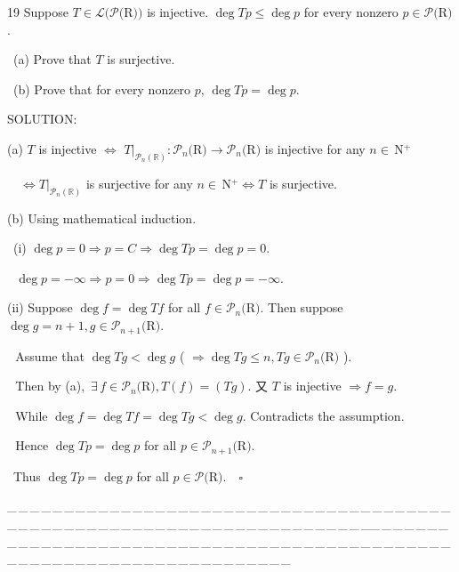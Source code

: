 \documentclass[a4paper, 11pt, UTF8]{article}
\def\Lm{\mathcal{L}}
\def\Po{\mathcal{P}}
\def\Rbb{\mathbb{R}}
\def\Nbp{$\,{\timesbf N}$^+}
\begin{document}
\begin{large}
{\timesbf\Large 19} {\timessl\Large 
Suppose $T\in\Lm(\Po(${\timesbf R}$))$ is injective. $\deg Tp\leq\deg p$ for every nonzero $p\in\Po(${\timesbf R}$)$.
}\par\quad\,
(a) {\timessl\Large Prove that $T$ is surjective.}\par\quad\,
(b) {\timessl\Large Prove that for every nonzero $p$, $\deg Tp=\deg p$.}\par
{\timesbf S\footnotesize{OLUTION:}}\par\quad
(a) $T$ is injective $\Longleftrightarrow$ $T|_{\Po_n(\Rbb)}:\Po_n(${\timesbf R}$)\rightarrow \Po_n(${\timesbf R}$)$ is injective for any $n\in\Nbp$\par\qquad\qquad\qquad\quad\,\,\,\,
$\Longleftrightarrow T|_{\Po_n(\Rbb)}$ is surjective for any $n\in\Nbp\Longleftrightarrow T$ is surjective.\par\quad
(b) Using mathematical induction.\par\qquad\,
(i) $\deg p=0\Rightarrow p=C\Rightarrow\deg Tp=\deg p=0.$\par\qquad\quad\,\,
$\deg p=-\infty\Rightarrow p=0\Rightarrow\deg Tp=\deg p=-\infty.$\par\qquad
(ii) Suppose $\deg f=\deg Tf$ for all $f\in\Po_{n}(${\timesbf R}$).$ Then suppose $\deg g=n+1,g\in\Po_{n+1}(${\timesbf R}$)$.\par\qquad\quad\,\,
Assume that $\deg Tg<\deg g$ ( $\Rightarrow\deg Tg\leq n,Tg\in\Po_{n}(${\timesbf R}$)$ ).\par\qquad\quad\,\,
Then by (a), \,$\exists\,f\in\Po_{n}(${\timesbf R}$),T(f)=(Tg).$ 又 $T$ is injective $\Rightarrow f=g$.\par\qquad\quad\,\,
While $\deg f=\deg Tf=\deg Tg<\deg g$. Contradicts the assumption.\par\qquad\quad\,\,
Hence $\deg Tp=\deg p$ for all $p\in\Po_{n+1}(${\timesbf R}$)$.\par\qquad\,
Thus $\deg Tp=\deg p$ for all $p\in\Po(${\timesbf R}$).\quad\square$
\par
{\tiny \_\,\_\,\_\,\_\,\_\,\_\,\_\,\_\,\_\,\_\,\_\,\_\,\_\,\_\,\_\,\_\,\_\,\_\,\_\,\_\,\_\,\_\,\_\,\_\,\_\,\_\,\_\,\_\,\_\,\_\,\_\,\_\,\_\,\_\,\_\,\_\,\_\,\_\,\_\,\_\,\_\,\_\,\_\,\_\,\_\,\_\,\_\,\_\,\_\,\_\,\_\,\_\,\_\,\_\,\_\,\_\,\_\,\_\,\_\,\_\,\_\,\_\,\_\,\_\,\_\,\_\,\_\,\_\,\_\,\_\,\_\_\,\_\,\_\,\_\,\_\,\_\,\_\,\_\,\_\,\_\,\_\,\_\,\_\,\_\,\_\,\_\,\_\,\_\,\_\,\_\,\_\,\_\,\_\,\_\,\_\,\_\,\_\,\_\,\_\,\_\,\_\,\_\,\_\,\_\,\_\,\_\,\_\,\_\,\_\,\_\,\_\,\_\,\_\,\_\,\_\,\_\,\_\,\_\,\_\,\_\,\_\,\_\,\_\,\_\,\_\,\_\,\_\,\_\,\_\,\_\,\_\,\_\,\_\,\_\,\_\,\_\,\_\,\_\,\_\,\_\,\_}\par

\end{large}
\end{document}

